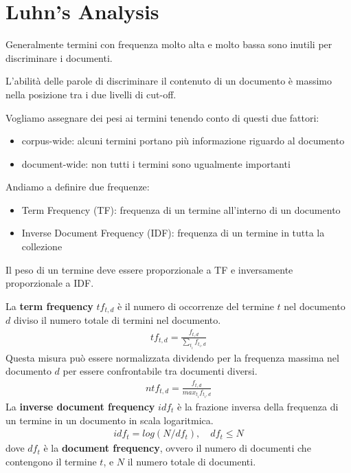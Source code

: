 \section{Luhn's Analysis}
Generalmente termini con frequenza molto alta e molto bassa sono inutili per discriminare i documenti.

\begin{center}
  \bigskip
  
\end{center}

L'abilità delle parole di discriminare il contenuto di un documento è massimo nella posizione tra i due livelli di cut-off.

Vogliamo assegnare dei pesi ai termini tenendo conto di questi due fattori:
\begin{itemize}
  \item corpus-wide: alcuni termini portano più informazione riguardo al documento
  \item document-wide: non tutti i termini sono ugualmente importanti
\end{itemize}

\pagebreak

Andiamo a definire due frequenze:
\begin{itemize}
  \item Term Frequency (TF): frequenza di un termine all'interno di un documento
  \item Inverse Document Frequency (IDF): frequenza di un termine in tutta la collezione
\end{itemize}

Il peso di un termine deve essere proporzionale a TF e inversamente proporzionale a IDF.

La \textbf{term frequency} $tf_{t, d}$ è il numero di occorrenze del termine $t$ nel documento $d$ diviso il numero totale di termini nel documento.
\begin{align*}
  tf_{t, d} = \frac{f_{t,d}}{\sum_{t_i} f_{t_i, d}}
\end{align*}
%
Questa misura può essere normalizzata dividendo per la frequenza massima nel documento $d$ per essere confrontabile tra documenti diversi.
\begin{align*}
  ntf_{t, d} = \frac{f_{t,d}}{max_{t_i} f_{t_i, d}}
\end{align*}
%
La \textbf{inverse document frequency} $idf_t$ è la frazione inversa della frequenza di un termine in un documento in scala logaritmica.
\begin{align*}
  idf_t = log(N/df_t), \quad df_t \leq N
\end{align*}
dove $df_t$ è la \textbf{document frequency}, ovvero il numero di documenti che contengono il termine $t$, e $N$ il numero totale di documenti.

